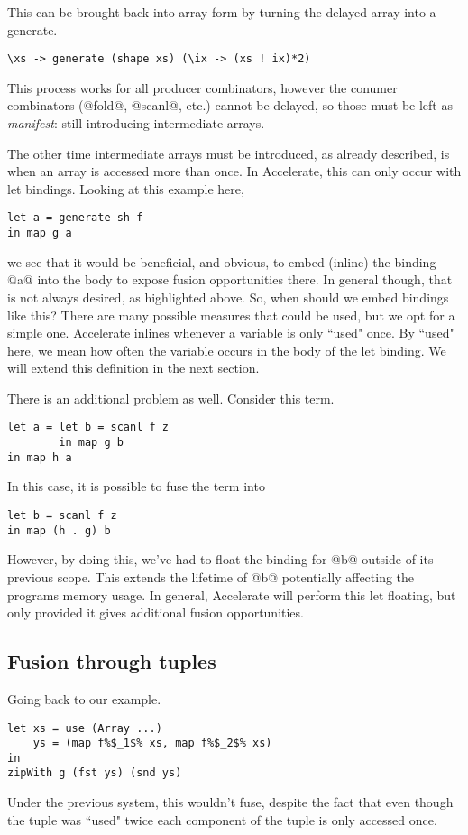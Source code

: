 This can be brought back into array form by turning the delayed array into a generate.
%
\begin{lstlisting}
\xs -> generate (shape xs) (\ix -> (xs ! ix)*2)
\end{lstlisting}
%

This process works for all producer combinators, however the conumer combinators (@fold@, @scanl@, etc.) cannot be delayed, so those must be left as \emph{manifest}: still introducing intermediate arrays.

The other time intermediate arrays must be introduced, as already described, is when an array is accessed more than once. In Accelerate, this can only occur with let bindings. Looking at this example here,
%
\begin{lstlisting}
let a = generate sh f
in map g a
\end{lstlisting}
%
we see that it would be beneficial, and obvious, to embed (inline) the binding @a@ into the body to expose fusion opportunities there. In general though, that is not always desired, as highlighted above. So, when should we embed bindings like this? There are many possible measures that could be used, but we opt for a simple one. Accelerate inlines whenever a variable is only ``used" once. By ``used" here, we mean how often the variable occurs in the body of the let binding. We will extend this definition in the next section.

There is an additional problem as well. Consider this term.
%
\begin{lstlisting}
let a = let b = scanl f z
        in map g b
in map h a
\end{lstlisting}
%
In this case, it is possible to fuse the term into
%
\begin{lstlisting}
let b = scanl f z
in map (h . g) b
\end{lstlisting}
%
However, by doing this, we've had to float the binding for @b@ outside of its previous scope. This extends the lifetime of @b@ potentially affecting the programs memory usage. In general, Accelerate will perform this let floating, but only provided it gives additional fusion opportunities.

\subsection{Fusion through tuples}

Going back to our example.
%
\begin{lstlisting}
let xs = use (Array ...)
    ys = (map f%$_1$% xs, map f%$_2$% xs)
in
zipWith g (fst ys) (snd ys)
\end{lstlisting}
%
Under the previous system, this wouldn't fuse, despite the fact that even though the tuple was ``used" twice each component of the tuple is only accessed once.

